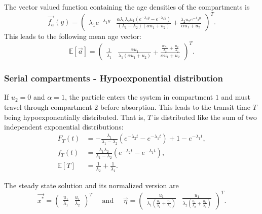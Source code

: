 \documentclass[smallextended]{svjour3}
\newcommand{\E}{\mathbb{E}}
\begin{document}
The vector valued function containing the age densities of the compartments is
\[
    \vec{f_a}(y) = \left(\begin{matrix}\lambda_{1} e^{- \lambda_{1} y} & \frac{\alpha \lambda_{1} \lambda_{2} u_{1} \left(e^{- \lambda_{2} y} - e^{- \lambda_{1} y}\right)}{\left(\lambda_{1} - \lambda_{2}\right) \left(\alpha u_{1} + u_{2}\right)} + \frac{\lambda_{2} u_{2} e^{- \lambda_{2} y}}{\alpha u_{1} + u_{2}}\end{matrix}\right)^T.
\]
This leads to the following mean age vector:
\[
    \E[\vec{a}] = \left(\begin{matrix}\frac{1}{\lambda_{1}} & \frac{\alpha u_{1}}{\lambda_{1} \left(\alpha u_{1} + u_{2}\right)} + \frac{\frac{\alpha u_{1}}{\lambda_{2}} + \frac{u_{2}}{\lambda_{2}}}{\alpha u_{1} + u_{2}}\end{matrix}\right)^T.
\]

\subsubsection{Serial compartments - Hypoexponential distribution}


If $u_2=0$ and $\alpha=1$, the particle enters the system in compartment $1$ and must travel through compartment $2$ before absorption.
This leads to the transit time $T$ being hypoexponentially distributed.
That is, $T$ is distributed like the sum of two independent exponential distributions:
\begin{align*}
    F_T(t) &= - \frac{\lambda_{1}}{\lambda_{1} - \lambda_{2}} \left(e^{- \lambda_{2} t} - e^{- \lambda_{1} t}\right) + 1 - e^{- \lambda_{1} t},\\
    f_T(t) &= \frac{\lambda_{1} \lambda_{2}}{\lambda_{1} - \lambda_{2}} \left(e^{- \lambda_{2} t} - e^{- \lambda_{1} t}\right),\\
    \E[T] &= \frac{1}{\lambda_{2}} + \frac{1}{\lambda_{1}}.
\end{align*}

The steady state solution and its normalized version are
\[
    \vec{x^\ast} = \left(\begin{matrix}\frac{u_{1}}{\lambda_{1}} & \frac{u_{1}}{\lambda_{2}}\end{matrix}\right)^T\quad\text{ and }\quad
    \vec{\eta} = \left(\begin{matrix}\frac{u_{1}}{\lambda_{1} \left(\frac{u_{1}}{\lambda_{2}} + \frac{u_{1}}{\lambda_{1}}\right)} & \frac{u_{1}}{\lambda_{2} \left(\frac{u_{1}}{\lambda_{2}} + \frac{u_{1}}{\lambda_{1}}\right)}\end{matrix}\right)^T.
\]
\end{document}
